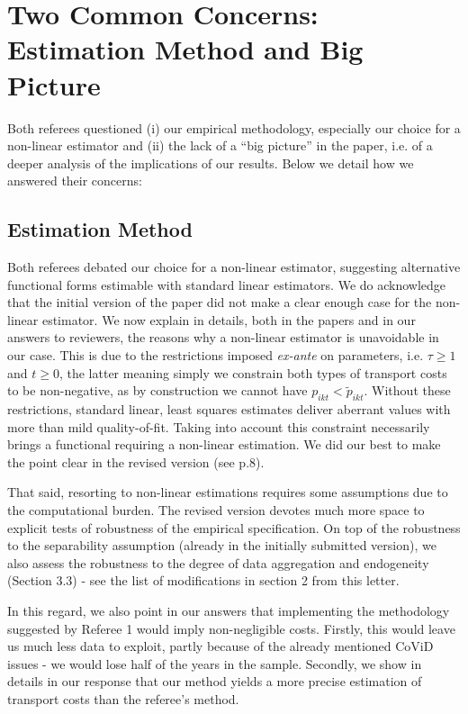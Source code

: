 \documentclass[12pt]{article}
\begin{document}
\section{Two Common Concerns: Estimation Method and Big Picture}
Both referees questioned (i) our empirical methodology, especially our choice for a non-linear estimator and (ii) the lack of a ``big picture'' in the paper, i.e. of a deeper analysis of the implications of our results. Below we detail how we answered their concerns:\medskip

\subsection{Estimation Method}
Both referees debated our choice for a non-linear estimator, suggesting alternative functional forms estimable with standard linear estimators. We do acknowledge that the initial version of the paper did not make a clear enough case for the non-linear estimator. We now explain in details, both in the papers and in our answers to reviewers, the reasons why a non-linear estimator is unavoidable in our case. This is due to the restrictions imposed \textit{ex-ante} on parameters, i.e. $\tau \geq 1$ and $t\geq 0$, the latter meaning simply we constrain both types of transport costs to be non-negative, as by construction we cannot have $p_{ikt} < \widetilde{p}_{ikt}$. Without these restrictions, standard linear, least squares estimates deliver aberrant values with more than mild quality-of-fit. Taking into account this constraint necessarily brings a functional requiring a non-linear estimation. We did our best to make the point clear in the revised version (see p.8). \medskip

That said, resorting to non-linear estimations requires some assumptions due to the computational burden. The revised version devotes much more space to explicit tests of robustness of the empirical specification. On top of the robustness to the separability assumption (already in the initially submitted version), we also assess the robustness to the degree of data aggregation and endogeneity (Section 3.3) - see the list of modifications in section 2 from this letter. \medskip

In this regard, we also point in our answers that implementing the methodology suggested by Referee 1 would imply non-negligible costs. Firstly, this would leave us much less data to exploit, partly  because of the already mentioned CoViD issues - we would lose half of the years in the sample. Secondly, we show in details in our response that our method yields a more precise estimation of transport costs than the referee's method. \medskip
\end{document}
